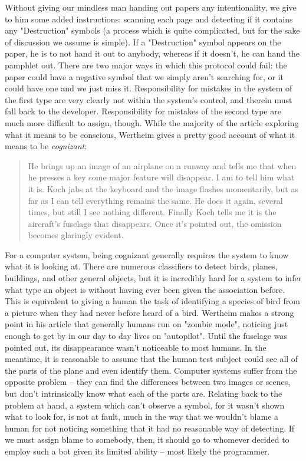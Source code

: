 \documentclass[12]{article}
\begin{document}
		Without giving our mindless man handing out papers any intentionality, we give to him some added instructions: scanning each page and detecting if it contains any "Destruction" symbols (a process which is quite complicated, but for the sake of discussion we assume is simple). If a "Destruction" symbol appears on the paper, he is to not hand it out to anybody, whereas if it doesn't, he can hand the pamphlet out. There are two major ways in which this protocol could fail: the paper could have a negative symbol that we simply aren't searching for, or it could have one and we just miss it. Responsibility for mistakes in the system of the first type are very clearly not within the system's control, and therein must fall back to the developer. Responsibility for mistakes of the second type are much more difficult to assign, though. While the majority of the article exploring what it means to be conscious, Wertheim gives a pretty good account of what it means to be \textit{cognizant}\cite{zombie_within}:

		\begin{quote}
			He brings up an image of an airplane on a runway and tells me that when he presses a key some major feature will disappear. I am to tell him what it is. Koch jabs at the keyboard and the image flashes momentarily, but as far as I can tell everything remains the same. He does it again, several times, but still I see nothing different. Finally Koch tells me it is the aircraft’s fuselage that disappears. Once it’s pointed out, the omission becomes glaringly evident.
		\end{quote}
		
		For a computer system, being cognizant generally requires the system to know what it is looking at. There are numerous classifiers to detect birds, planes, buildings, and other general objects, but it is incredibly hard for a system to infer what type an object is without having ever been given the association before. This is equivalent to giving a human the task of identifying a species of bird from a picture when they had never before heard of a bird. Wertheim makes a strong point in his article that generally humans run on "zombie mode"\cite{zombie_within}, noticing just enough to get by in our day to day lives on "autopilot"\cite{zombie_within}. Until the fuselage was pointed out, its disappearance wasn't noticeable to most humans. In the meantime, it is reasonable to assume that the human test subject could see all of the parts of the plane and even identify them. Computer systems suffer from the opposite problem -- they can find the differences between two images or scenes, but don't intrinsically know what each of the parts are. Relating back to the problem at hand, a system which can't observe a symbol, for it wasn't shown what to look for, is not at fault, much in the way that we wouldn't blame a human for not noticing something that it had no reasonable way of detecting. If we must assign blame to somebody, then, it should go to whomever decided to employ such a bot given its limited ability -- most likely the programmer.
\end{document}
